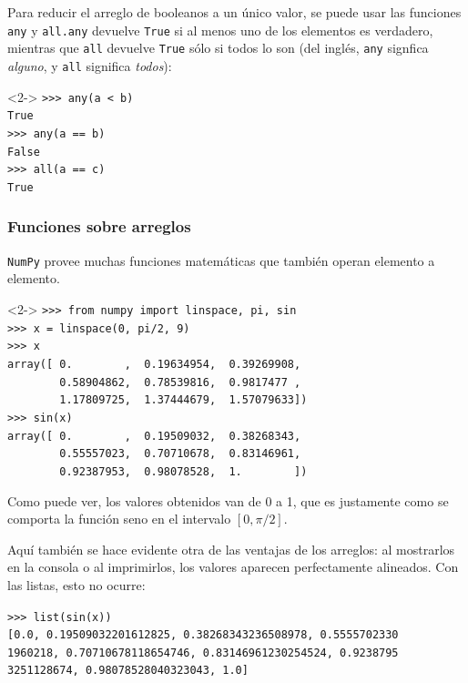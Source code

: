 \begin{frame}[fragile]
Para reducir el arreglo de booleanos a un único valor, se puede usar las funciones \texttt{any} y \texttt{all.any} devuelve \texttt{True} si al menos uno de los elementos es verdadero, mientras que \texttt{all} devuelve \texttt{True} sólo si todos lo son (del inglés, \texttt{any} signfica \textit{alguno}, y \texttt{all} significa \textit{todos}):
\begin{exampleblock}{}<2->
\verb|>>> any(a < b)| \\
\pause
\verb|True| \\
\pause
\verb|>>> any(a == b)| \\
\pause
\verb|False| \\
\pause
\verb|>>> all(a == c)| \\
\pause
\verb|True|
\end{exampleblock}
\end{frame}
\begin{frame}[fragile]
\frametitle{Funciones sobre arreglos}
\texttt{NumPy} provee muchas funciones matemáticas que también operan elemento a elemento.
\begin{exampleblock}{}<2->
\verb|>>> from numpy import linspace, pi, sin| \\
\verb|>>> x = linspace(0, pi/2, 9)| \\
\fontsize{10}{10}\selectfont
\verb|>>> x| \\
\pause
\verb|array([ 0.        ,  0.19634954,  0.39269908,|\\ 
\verb|        0.58904862,  0.78539816,  0.9817477 ,|\\
\verb|        1.17809725,  1.37444679,  1.57079633])| \\
\verb|>>> sin(x)| \\
\pause
\verb|array([ 0.        ,  0.19509032,  0.38268343,| \\
\verb|        0.55557023,  0.70710678,  0.83146961,| \\
\verb|        0.92387953,  0.98078528,  1.        ])|
\end{exampleblock}
Como puede ver, los valores obtenidos van de 0 a 1, que es justamente como se comporta la función seno en el intervalo $[0, \pi/2]$.
\end{frame}
\begin{frame}[fragile]
Aquí también se hace evidente otra de las ventajas de los arreglos: al mostrarlos en la consola o al imprimirlos, los valores aparecen perfectamente alineados. Con las listas, esto no ocurre:
\fontsize{12}{12}\selectfont
\begin{exampleblock}{}
\verb|>>> list(sin(x))| \\
\pause
\verb|[0.0, 0.19509032201612825, 0.38268343236508978, 0.5555702330| \\
\verb|1960218, 0.70710678118654746, 0.83146961230254524, 0.9238795| \\
\verb|3251128674, 0.98078528040323043, 1.0]|
\end{exampleblock}
\end{frame}

